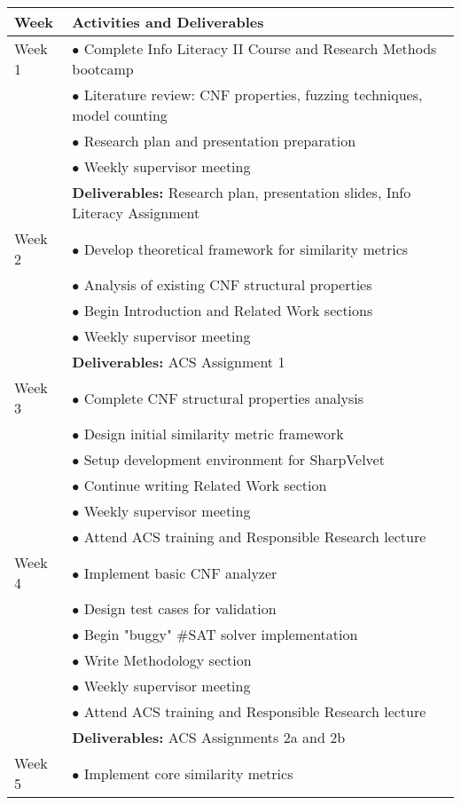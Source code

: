 \documentclass[english, a4paper]{article}
\begin{document}
\begin{tabular}{|p{}|p{}|}
\hline
\textbf{Week} & \textbf{Activities and Deliverables} \\
\hline
Week 1 & 
$\bullet$ Complete Info Literacy II Course and Research Methods bootcamp \\
& $\bullet$ Literature review: CNF properties, fuzzing techniques, model counting \\
& $\bullet$ Research plan and presentation preparation \\
& $\bullet$ Weekly supervisor meeting \\
& \textbf{Deliverables:} Research plan, presentation slides, Info Literacy Assignment \\
\hline
Week 2 & 
$\bullet$ Develop theoretical framework for similarity metrics \\
& $\bullet$ Analysis of existing CNF structural properties \\
& $\bullet$ Begin Introduction and Related Work sections \\
& $\bullet$ Weekly supervisor meeting \\
& \textbf{Deliverables:} ACS Assignment 1 \\
\hline
Week 3 & 
$\bullet$ Complete CNF structural properties analysis \\
& $\bullet$ Design initial similarity metric framework \\
& $\bullet$ Setup development environment for SharpVelvet \\
& $\bullet$ Continue writing Related Work section \\
& $\bullet$ Weekly supervisor meeting \\
& $\bullet$ Attend ACS training and Responsible Research lecture \\
\hline
Week 4 & 
$\bullet$ Implement basic CNF analyzer \\
& $\bullet$ Design test cases for validation \\
& $\bullet$ Begin "buggy" \#SAT solver implementation \\
& $\bullet$ Write Methodology section \\
& $\bullet$ Weekly supervisor meeting \\
& $\bullet$ Attend ACS training and Responsible Research lecture \\
& \textbf{Deliverables:} ACS Assignments 2a and 2b \\
\hline
Week 5 & 
$\bullet$ Implement core similarity metrics \\

\end{tabular}
\end{document}

